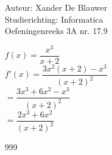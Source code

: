 \documentclass[a4paper]{article}
\begin{document}
\noindent \large Auteur: Xander De Blauwer \\
\noindent \large Studierichting: Informatica\\
\noindent \large Oefeningenreeks 3A nr. 17.9 \\

\medskip

\normalsize

$f(x) = \dfrac{x^3}{x+2}$ \\

$f'(x) = \dfrac{3x^2(x+2)-x^3}{(x+2)^2}$ \\

$ = \dfrac{3x^3 + 6x^2 - x^3}{(x+2)^2}$ \\

$ = \dfrac{2x^3 + 6x^2}{(x+2)^2}$ \\




\begin{thebibliography}{999}
\end{thebibliography}
\end{document}
